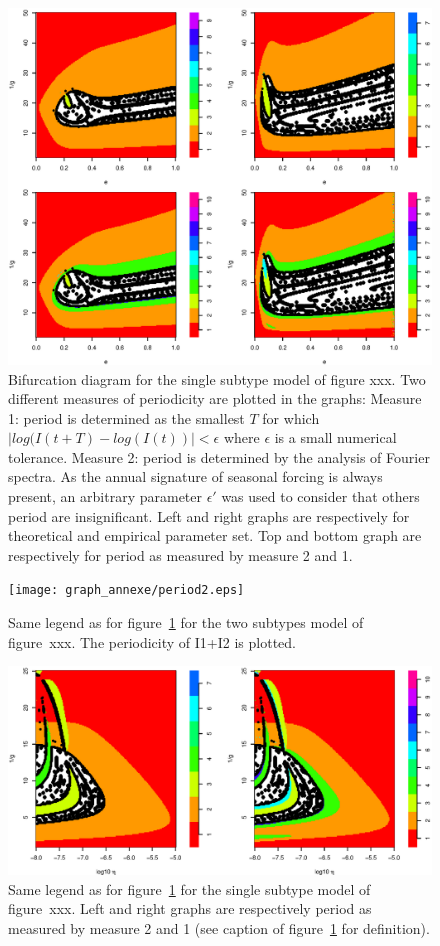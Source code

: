 \documentclass[12pt]{article}
\begin{document}
\begin{figure}[htb]
  \center
    \includegraphics[width= 0.8 \linewidth]{graph_annexe/period1.eps}
    \caption{Bifurcation diagram for the single subtype model of
      figure xxx. Two different measures of periodicity are
      plotted in the graphs: Measure 1: period is determined as the
      smallest $T$ for which $|log(I(t+T)-log(I(t))|< \epsilon$ where
      $\epsilon$ is a small numerical tolerance. Measure 2: period is
      determined by the analysis of Fourier spectra. As the annual
      signature of seasonal forcing is always present, an arbitrary
      parameter $\epsilon'$ was used to consider that others period are
      insignificant. Left and right graphs are respectively for
      theoretical and empirical parameter set. Top and bottom graph
      are respectively for period as measured by measure 2 and 1.}
  \label{fig:period1}
\end{figure}

\begin{figure}[htb]
  \center
    \texttt{[image: graph\_annexe/period2.eps]}
    \caption{Same legend as for figure~\ref{fig:period1} for the two
      subtypes model of figure~xxx. The periodicity of
      I1+I2 is plotted.}
  \label{fig:period2}
\end{figure}


\begin{figure}[htb]
  \center
    \includegraphics[width= 0.8 \linewidth]{graph_annexe/period_bestfit.eps}
    \caption{Same legend as for figure~\ref{fig:period1} for the
      single subtype model of figure~xxx. Left and
      right graphs are respectively period as measured by measure 2
      and 1 (see caption of figure~\ref{fig:period1} for definition).}
  \label{fig:peiod1best}
\end{figure}

\clearpage




\end{document}
